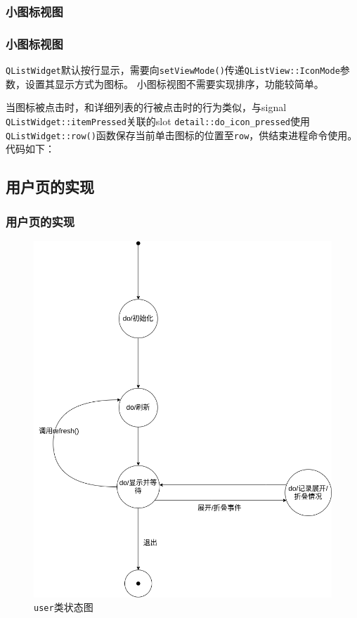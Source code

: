 \documentclass{beamer}
\newcommand\code[1]{\texttt{#1}}
\begin{document}
\subsubsection{小图标视图}
\begin{frame}
    \frametitle{小图标视图}
\code{QListWidget}默认按行显示，需要向\code{setViewMode()}传递\code{QListView::IconMode}参数，设置其显示方式为图标。
    小图标视图不需要实现排序，功能较简单。

当图标被点击时，和详细列表的行被点击时的行为类似，与signal \code{QListWidget::itemPressed}关联的slot \code{detail::do\_icon\_pressed}使用\code{QListWidget::row()}函数保存当前单击图标的位置至\code{row}，供结束进程命令使用。代码如下：

{
    \ttfamily
    
}
\end{frame}

\subsection{用户页的实现}
\begin{frame}
    \frametitle{用户页的实现}
    \begin{figure}
        \centering
        \includegraphics[scale=0.23]{../dia/user.png}
        \caption{\code{user}类状态图}
    \end{figure}
\end{frame}
\end{document}
